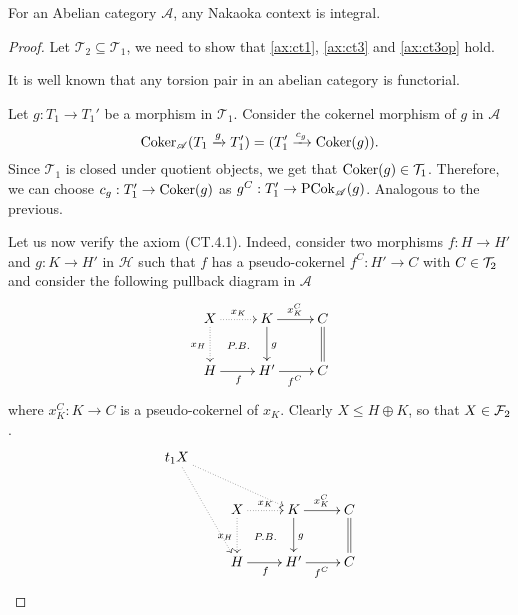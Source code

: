\begin{lemma}\label{rmk:2.2}
For an Abelian category $\mathscr{A}$, any Nakaoka context is integral.
\end{lemma}
\begin{proof}
  Let $\mathcal{T}_2\subseteq\mathcal{T}_1$, we need to show that \ref{ax:ct1},
  \ref{ax:ct3} and \ref{ax:ct3op} hold.
  \begin{torsionaxioms}
    \item It is well known that any torsion pair in an abelian category is functorial.
    \setcounter{enumi}{2}
    \item Let $g:T_1\to T_1'$ be a morphism in $\mathcal{T}_1$. Consider the cokernel morphism
    of $g$ in $\mathscr{A}$
    \begin{equation*}
      \operatorname{Coker}_\mathscr{A}(T_1\xrightarrow{g}T_1')=(T_1'\xrightarrow{c_g}\operatorname{Coker}(g)).
    \end{equation*}
    Since $\mathcal{T}_1$ is closed under quotient objects, we get that $\operatorname{Coker}(g)\in\mathcal{T}_1$.
    Therefore, we can choose $c_g:T_1'\to\operatorname{Coker}(g)$ as $g^C:T_1'\to\operatorname{PCok}_\mathscr{A}(g)$.
    \varitem{^\ast} Analogous to the previous.
  \end{torsionaxioms}

\bigskip\bigskip
Let us now verify the axiom (CT.4.1). Indeed, consider two morphisms $f\colon H\to H'$ and $g\colon K\to H'$ in $\mathcal{H}$ such that $f$ has a pseudo-cokernel $f^C\colon H'\to C$ with $C\in \mathcal{T}_2$ and consider the following pullback diagram in $\mathscr{A}$
\[
\xymatrix{
X\ar@{}[dr]|{P.B.}\ar@{.>}[d]_{x_H}\ar@{.>}[r]^{x_K}&K\ar[r]^{x_K^C}\ar[d]^{g}&C\ar@{=}[d]\\
H\ar[r]_f&H'\ar[r]_{f^C}&C
}
\]
where $x_K^C\colon K\to C$ is a pseudo-cokernel of $x_K$. Clearly $X\leq H\oplus K$, so that $X\in \mathcal{F}_2$.
\[
\xymatrix{
t_1X\ar@{.>}[rrd]\ar@{.>}[ddr]\\
&X\ar@{}[dr]|{P.B.}\ar@{.>}[d]_{x_H}\ar@{.>}[r]^{x_K}&K\ar[r]^{x_K^C}\ar[d]^{g}&C\ar@{=}[d]\\
&H\ar[r]_f&H'\ar[r]_{f^C}&C
}
\]
\end{proof}

